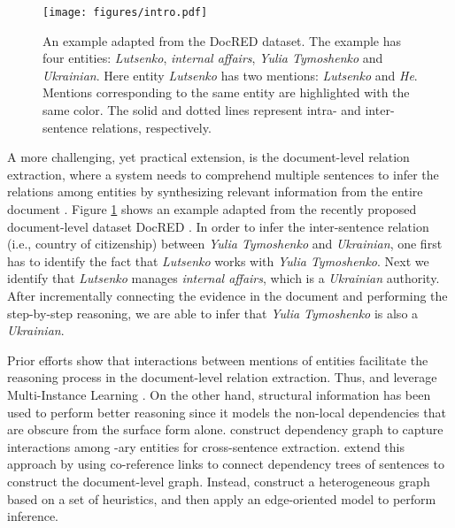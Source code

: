 \documentclass[11pt,a4paper]{article}
\begin{document}
\begin{figure}
    \centering
    \texttt{[image: figures/intro.pdf]}
    \vspace{-2mm}
    \caption{An example adapted from the DocRED dataset. The example has four entities: \textit{Lutsenko}, \textit{internal affairs}, \textit{Yulia Tymoshenko} and \textit{Ukrainian}. Here entity \textit{Lutsenko} has two mentions: \textit{Lutsenko} and \textit{He}. Mentions corresponding to the same entity are highlighted with the same color. The solid and dotted lines represent intra- and inter-sentence relations, respectively.}
    \vspace{-4mm}
    \label{fig:intro}
\end{figure}

A more challenging, yet practical extension, is the document-level relation extraction, where a system needs to comprehend multiple sentences to infer the relations among entities by synthesizing relevant information from the entire document \citep{Jia2019DocumentLevelNR, yao2019DocRED}. Figure \ref{fig:intro} shows an example adapted from the recently proposed document-level dataset DocRED \citep{yao2019DocRED}. In order to infer the inter-sentence relation (i.e., country of citizenship) between \textit{Yulia Tymoshenko} and \textit{Ukrainian}, one first has to identify the fact that \textit{Lutsenko} works with \textit{Yulia Tymoshenko}. Next we identify that \textit{Lutsenko} manages \textit{internal affairs}, which is a \textit{Ukrainian} authority. After incrementally connecting the evidence in the document and performing the step-by-step reasoning, we are able to infer that \textit{Yulia Tymoshenko} is also a \textit{Ukrainian}.

Prior efforts show that interactions between mentions of entities facilitate the reasoning process in the document-level relation extraction. Thus, \citet{Verga2018SimultaneouslyST} and \citet{Jia2019DocumentLevelNR} leverage Multi-Instance Learning \citep{Riedel2010ModelingRA, Surdeanu2012MultiinstanceML}. On the other hand, structural information has been used to perform better reasoning since it models the non-local dependencies that are obscure from the surface form alone. \citet{Peng2017CrossSentenceNR} construct dependency graph to capture interactions among -ary entities for cross-sentence extraction. \citet{Sahu2019IntersentenceRE} extend this approach by using co-reference links to connect dependency trees of sentences to construct the document-level graph. Instead, \citet{christopoulou2019connecting} construct a heterogeneous graph based on a set of heuristics, and then apply an edge-oriented model \citep{christopoulou2018walk} to perform inference. 
\end{document}
